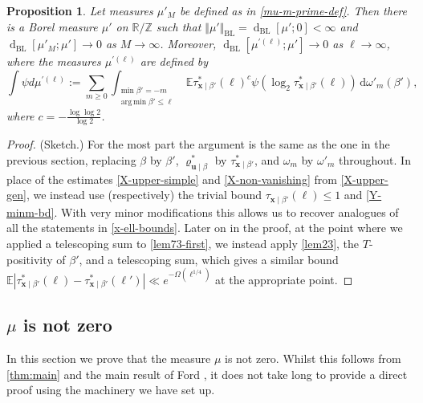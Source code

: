 \documentclass[11pt,reqno]{amsart}
\DeclareMathOperator*{\argmin}{arg\,min}
\numberwithin{equation}{section}
\newtheorem{proposition}[theorem]{Proposition}
\theoremstyle{definition}
\theoremstyle{remark}
\newcommand{\mb}{\mathbb}
\newcommand{\mbf}{\mathbf}
\newcommand{\dist}[2]{{\operatorname{d}_{\operatorname{BL}}[#1;#2]}}
\def\BL{\operatorname{BL}}
\renewcommand{\le}{\leqslant}
\renewcommand{\ge}{\geqslant}
\newcommand\Z{\mathbb{Z}}
\newcommand\R{\mathbb{R}}
\begin{document}
\begin{proposition}\label{main-mu-prime-conv-prop} 
Let measures $\mu'_M$ be defined as in \cref{mu-m-prime-def}. Then there is a Borel measure $\mu'$ on $\R/\Z$ such that $\Vert \mu' \Vert_{\BL} = \dist{\mu'}{0} < \infty$ and $\dist{\mu'_M}{\mu'} \rightarrow 0$ as $M \rightarrow \infty$. Moreover, $\dist{\mu^{\prime (\ell)}}{\mu'} \rightarrow 0$ as $\ell \rightarrow \infty$, where the measures $\mu^{\prime (\ell)}$ are defined by
\begin{equation}\label{mu-prime-ell-def} \int \psi d \mu^{\prime (\ell)} := \sum_{m \ge 0}\int_{\substack{\min \beta' = -m \\ \argmin \beta' \le \ell}} \mb{E} \tau^*_{\mbf{x} \mid \beta'}(\ell)^c \psi (\log_2 \tau^*_{\mbf{x} \mid \beta'}(\ell)) \, \mathrm{d}\omega'_m(\beta'),\end{equation} where $c = -\frac{\log \log 2}{\log 2}$.
\end{proposition}
\begin{proof} (Sketch.)
For the most part the argument is the same as the one in the previous section, replacing $\beta$ by $\beta'$, $\varrho^*_{\mbf{u} \mid \beta}$ by $\tau^*_{\mbf{x} \mid \beta'}$, and $\omega_m$ by $\omega'_m$ throughout. In place of the estimates \cref{X-upper-simple} and \cref{X-non-vanishing} from \cref{X-upper-gen}, we instead use (respectively) the trivial bound $\tau_{\mbf{x} \mid \beta'}(\ell) \le 1$ and \cref{Y-minm-bd}. With very minor modifications this allows us to recover analogues of all the statements in \cref{x-ell-bounds}. Later on in the proof, at the point where we applied a telescoping sum to \cref{lem73-first}, we instead apply \cref{lem23}, the $T$-positivity of $\beta'$, and a telescoping sum, which gives a similar bound $\mb{E} |\tau^*_{\mbf{x} \mid \beta'}(\ell) - \tau^*_{\mbf{x} \mid \beta'}(\ell')| \ll e^{-\Omega(\ell^{1/4})}$ at the appropriate point.
\end{proof}



\subsection{$\mu$ is not zero}\label{mu-not-zero}
In this section we prove that the measure $\mu$ is not zero. Whilst this follows from \cref{thm:main} and the main result of Ford \cite{For08}, it does not take long to provide a direct proof using the machinery we have set up.
\end{document}
